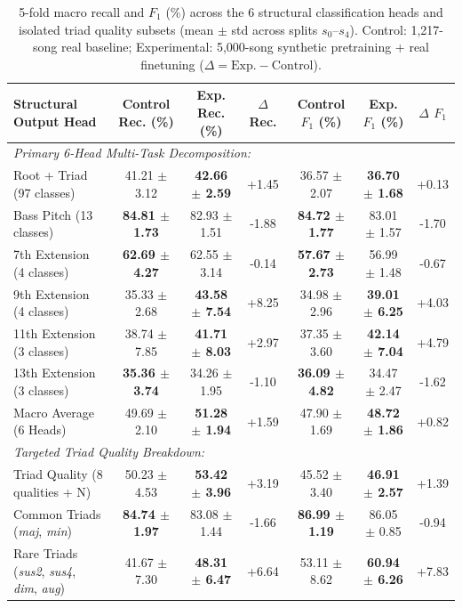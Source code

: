 \documentclass{article}
\begin{document}
\begin{table}[t]
\centering
\footnotesize
\renewcommand{\arraystretch}{0.88}
\vspace{-8pt}
\caption{5-fold macro recall and $F_1$ (\%) across the 6 structural classification heads and isolated triad quality subsets (mean $\pm$ std across splits $s_0$--$s_4$). Control: 1,217-song real baseline; Experimental: 5,000-song synthetic pretraining + real finetuning ($\Delta = \text{Exp.} - \text{Control}$).}
\label{tab:head_metrics}
\vspace{1pt}
\begin{tabular}{lcccccc}
\toprule
\textbf{Structural Output Head} & \textbf{Control Rec. (\%)} & \textbf{Exp. Rec. (\%)} & \textbf{$\Delta$ Rec.} & \textbf{Control $F_1$ (\%)} & \textbf{Exp. $F_1$ (\%)} & \textbf{$\Delta$ $F_1$} \\
\midrule
\multicolumn{7}{l}{\textit{Primary 6-Head Multi-Task Decomposition:}} \\
  Root + Triad (97 classes)                     & 41.21 $\pm$ 3.12 & \textbf{42.66 $\pm$ 2.59} & +1.45 & 36.57 $\pm$ 2.07 & \textbf{36.70 $\pm$ 1.68} & +0.13 \\
  Bass Pitch (13 classes)                       & \textbf{84.81 $\pm$ 1.73} & 82.93 $\pm$ 1.51 & -1.88 & \textbf{84.72 $\pm$ 1.77} & 83.01 $\pm$ 1.57 & -1.70 \\
  7th Extension (4 classes)                     & \textbf{62.69 $\pm$ 4.27} & 62.55 $\pm$ 3.14 & -0.14 & \textbf{57.67 $\pm$ 2.73} & 56.99 $\pm$ 1.48 & -0.67 \\
  9th Extension (4 classes)                     & 35.33 $\pm$ 2.68 & \textbf{43.58 $\pm$ 7.54} & +8.25 & 34.98 $\pm$ 2.96 & \textbf{39.01 $\pm$ 6.25} & +4.03 \\
  11th Extension (3 classes)                    & 38.74 $\pm$ 7.85 & \textbf{41.71 $\pm$ 8.03} & +2.97 & 37.35 $\pm$ 3.60 & \textbf{42.14 $\pm$ 7.04} & +4.79 \\
  13th Extension (3 classes)                    & \textbf{35.36 $\pm$ 3.74} & 34.26 $\pm$ 1.95 & -1.10 & \textbf{36.09 $\pm$ 4.82} & 34.47 $\pm$ 2.47 & -1.62 \\
\midrule
  Macro Average (6 Heads)                       & 49.69 $\pm$ 2.10 & \textbf{51.28 $\pm$ 1.94} & +1.59 & 47.90 $\pm$ 1.69 & \textbf{48.72 $\pm$ 1.86} & +0.82 \\
\midrule
\multicolumn{7}{l}{\textit{Targeted Triad Quality Breakdown:}} \\
  Triad Quality (8 qualities + N)               & 50.23 $\pm$ 4.53 & \textbf{53.42 $\pm$ 3.96} & +3.19 & 45.52 $\pm$ 3.40 & \textbf{46.91 $\pm$ 2.57} & +1.39 \\
  Common Triads (\textit{maj}, \textit{min})    & \textbf{84.74 $\pm$ 1.97} & 83.08 $\pm$ 1.44 & -1.66 & \textbf{86.99 $\pm$ 1.19} & 86.05 $\pm$ 0.85 & -0.94 \\
  Rare Triads (\textit{sus2}, \textit{sus4}, \textit{dim}, \textit{aug}) & 41.67 $\pm$ 7.30 & \textbf{48.31 $\pm$ 6.47} & +6.64 & 53.11 $\pm$ 8.62 & \textbf{60.94 $\pm$ 6.26} & +7.83 \\
\bottomrule
\end{tabular}
\vspace{-2mm}
\end{table}
\end{document}

